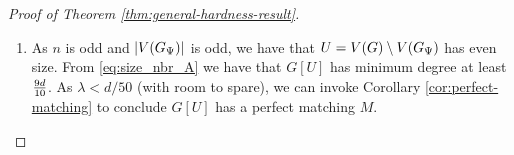 \documentclass[11pt]{article}
\providecommand{\DIFaddbegin}{} %
\providecommand{\DIFaddend}{} %
\providecommand{\DIFdelbegin}{} %
\providecommand{\DIFdelend}{} %
\begin{document}
\begin{proof}[Proof of Theorem \ref{thm:general-hardness-result}]
\begin{enumerate}
{    We can describe $G_\EmbeddingFunc$ as a function $\EmbeddingFunc: V(H) \to B$ together with a collection of pairwise vertex-disjoint (other than at the endpoints) paths  $\Path{\Embedding{u}}{\Embedding{v}}$ in $G[B]$, for $(u,v) \in E(H)$.
    Observe that it is at least as hard to refute\footnote{Note that this by itself does not guarantee it is hard to refute $\PM{G}$. We need item (3) and this to show hardness of refuting $\PM{G}$.} $\PM{G_{\EmbeddingFunc}}$ as it is to refute $\PM{H}$.
To see why, let $y_1, \dots, y_{E(H)}$ denote the variables for the $\PM{H}$ formulae for each edge of $H$.
We use as shorthand $\mathcal{Y} = (y_e)_{e \in E(H)}$ and $\Complement{\mathcal{Y}} = (\Complement{y}_e)_{e \in E(H)}$.
Define a mapping $\rho': \Edges{G_\EmbeddingFunc} \to \{0,1, \mathcal{Y}, \Complement{\mathcal{Y}} \}$ as follows. For each $(u,v) \in E(H)$, let $\rho'(x_e) = y_{u,v}$ where $e$ is the first edge on the path $\Path{\Embedding{u}}{\Embedding{v}}$.
Map each variable $x_e$ for $e \in \Path{\Embedding{u}}{\Embedding{v}}$ alternately to $y_{u,v}$ or $\bar{y}_{u,v}$, such that the edges of the path adjacent to $\Embedding{u}$ and $\Embedding{v}$ are set to $y_{u,v}$. This is always possible as $\Path{u}{v}$ has odd length. Observe that $\PM{G_\EmbeddingFunc}|_{\rho'} \equiv \PM{H}$. 
  }
\DIFaddend 

\DIFdelbegin %
\DIFdelend \DIFaddbegin \item{ As $n$ is odd and $|V(G_{\Psi})|$ is odd, we have that $U = V(G) \setminus V(G_{\Psi})$ has even size. From \eqref{eq:size_nbr_A} we have that $G[U]$ has minimum degree at least $\frac{9d}{10}$. As $\lambda < d/50$ (with room to spare), we can invoke Corollary \ref{cor:perfect-matching} to conclude $G[U]$ has a perfect matching $M$. 
}
  \DIFaddend 


\end{enumerate}
\end{proof}
\end{document}
